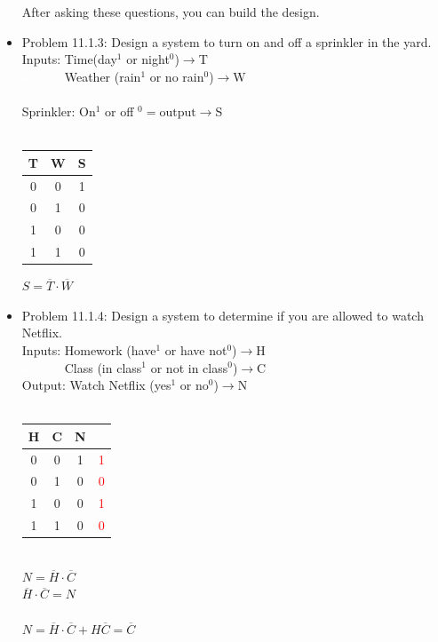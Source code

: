 \documentclass[10pt,a4paper]{article}
\newcommand{\ol}[1]{\overline{#1}}
\begin{document}
\begin{itemize}
\begin{itemize}
\end{itemize}
After asking these questions, you can build the design.
\item Problem 11.1.3: Design a system to turn on and off a sprinkler in the yard.\\
Inputs: Time(day$^1$ or night$^0$)$\to $T\\
\textcolor{white}{Inputs: }Weather (rain$^1$ or no rain$^0$)$\to $W\\~\\
Sprinkler: On$^1$ or off $^0=\text{output}\to$S\\~\\
\begin{tabular}{|cc|c|}
T & W & S\\
\hline
0 & 0 & 1\\
0 & 1 & 0\\
1 & 0 & 0\\
1 & 1 & 0\\
\end{tabular} $S=\ol{T}\cdot\ol{W}$\\
\item Problem 11.1.4: Design a system to determine if you are allowed to watch Netflix.\\
Inputs: Homework (have$^1$ or have not$^0$)$\to$H\\
\textcolor{white}{Inputs: }Class (in class$^1$ or not in class$^0$)$\to$C\\
Output: Watch Netflix (yes$^1$ or no$^0$)$\to$N\\~\\
\begin{tabular}{|cc|cc|}
H & C & N & \\
\hline
0 & 0 & 1 & \textcolor{red}1\\
0 & 1 & 0 & \textcolor{red}0\\
1 & 0 & 0 & \textcolor{red}1\\
1 & 1 & 0 & \textcolor{red}0\\
\end{tabular}\\
$N=\ol{H}\cdot\ol{C}$\\$\ol{H}\cdot\ol{C}=N$\\~\\
$N=\ol{H}\cdot\ol{C}+H\ol{C}=\ol{C}$\\
\end{itemize}
\end{document}
